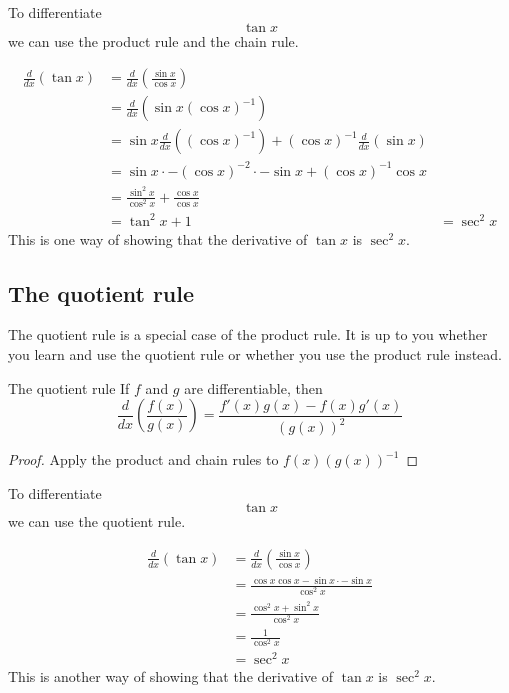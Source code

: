 \begin{example}
To differentiate $$\tan x$$ we can use the product rule and the chain rule.

\begin{align*}
\frac{d}{dx}\left(\tan x\right)&=\frac{d}{dx}\left(\frac{\sin x}{\cos x}\right)\\
&=\frac{d}{dx}\left(\sin x(\cos x)^{-1}\right)\\
&=\sin x\frac{d}{dx}\left((\cos x)^{-1}\right)+(\cos x)^{-1}\frac{d}{dx}\left(\sin x\right)\\
&=\sin x\cdot-(\cos x)^{-2}\cdot-\sin x+(\cos x)^{-1}\cos x\\
&=\frac{\sin^2 x}{\cos^2 x}+\frac{\cos x}{\cos x}\\
&=\tan^2 x +1
&=\sec^2 x
\end{align*}
This is one way of showing that the derivative of $\tan x$ is $\sec^2 x$.
\end{example}

\subsection{The quotient rule}
The quotient rule is a special case of the product rule. It is up to you whether you learn and use the quotient rule or whether you use the product rule instead.
\begin{thing}{The quotient rule}
If $f$ and $g$ are differentiable, then
\[\frac{d}{dx}\left( \frac{f(x)}{g(x)} \right) = \frac{f'(x)g(x) - f(x)g'(x)}{(g(x))^2}\]
\begin{proof}
Apply the product and chain rules to $f(x)(g(x))^{-1}$
\end{proof}
\end{thing}

\begin{example}
To differentiate $$\tan x$$ we can use the quotient rule.

\begin{align*}
\frac{d}{dx}\left(\tan x\right)&=\frac{d}{dx}\left(\frac{\sin x}{\cos x}\right)\\
&=\frac{\cos x\cos x - \sin x\cdot-\sin x}{\cos^2x}\\
&=\frac{\cos^2 x + \sin^2 x}{\cos^2x}\\
&=\frac{1}{\cos^2x}\\
&=\sec^2 x
\end{align*}
This is another way of showing that the derivative of $\tan x$ is $\sec^2 x$.
\end{example}

